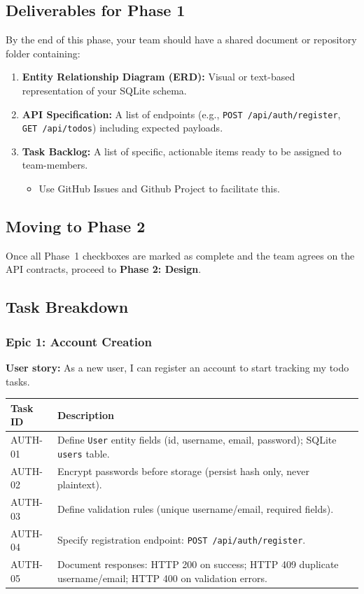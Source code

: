 \subsection{Deliverables for Phase 1}
By the end of this phase, your team should have a shared document or repository folder containing:
\begin{enumerate}
  \item \textbf{Entity Relationship Diagram (ERD):} Visual or text-based representation of your SQLite schema.
  \item \textbf{API Specification:} A list of endpoints (e.g., \texttt{POST /api/auth/register}, \texttt{GET /api/todos}) including expected payloads.
  \item \textbf{Task Backlog:} A list of specific, actionable items ready to be assigned to team-members.
  \begin{itemize}
    \item Use GitHub Issues and Github Project to facilitate this.
  \end{itemize}
\end{enumerate}

\subsection{Moving to Phase 2}
Once all Phase~1 checkboxes are marked as complete and the team agrees on the API contracts,
proceed to \textbf{Phase 2: Design}.








\newpage
\subsection{Task Breakdown}\label{sec:tasks}

\subsubsection{Epic 1: Account Creation}
\textbf{User story:} As a new user, I can register an account to start tracking my todo tasks.

\begin{tabularx}{\textwidth}{@{} p{2.4cm} X @{}}
\toprule
\textbf{Task ID} & \textbf{Description} \\
\midrule 
AUTH-01 & Define \texttt{User} entity fields (id, username, email, password); SQLite \texttt{users} table. \\
AUTH-02 & Encrypt passwords before storage (persist hash only, never plaintext). \\
AUTH-03 & Define validation rules (unique username/email, required fields). \\
AUTH-04 & Specify registration endpoint: \texttt{POST /api/auth/register}. \\
AUTH-05 & Document responses: HTTP 200 on success; HTTP 409 duplicate username/email; HTTP 400 on validation errors. \\
\bottomrule
\end{tabularx}

